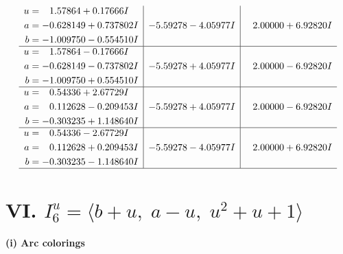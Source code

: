 \documentclass[1p]{elsarticle_modified}
\theoremstyle{definition}
\begin{document}
$$\begin{array}{c|c|c}
\begin{aligned}
u &= \phantom{-}1.57864 + 0.17666 I \\
a &= -0.628149 + 0.737802 I \\
b &= -1.009750 - 0.554510 I\end{aligned}
 & -5.59278 - 4.05977 I & \phantom{-}2.00000 + 6.92820 I \\ \hline\begin{aligned}
u &= \phantom{-}1.57864 - 0.17666 I \\
a &= -0.628149 - 0.737802 I \\
b &= -1.009750 + 0.554510 I\end{aligned}
 & -5.59278 + 4.05977 I & \phantom{-}2.00000 - 6.92820 I \\ \hline\begin{aligned}
u &= \phantom{-}0.54336 + 2.67729 I \\
a &= \phantom{-}0.112628 - 0.209453 I \\
b &= -0.303235 + 1.148640 I\end{aligned}
 & -5.59278 + 4.05977 I & \phantom{-}2.00000 - 6.92820 I \\ \hline\begin{aligned}
u &= \phantom{-}0.54336 - 2.67729 I \\
a &= \phantom{-}0.112628 + 0.209453 I \\
b &= -0.303235 - 1.148640 I\end{aligned}
 & -5.59278 - 4.05977 I & \phantom{-}2.00000 + 6.92820 I\\
 \hline 
 \end{array}$$\newpage\newpage\renewcommand{\arraystretch}{1}
\centering \section*{VI. $I^u_{6}= \langle b+u,\;a- u,\;u^2+u+1 \rangle$}
\flushleft \textbf{(i) Arc colorings}\\
\end{document}
